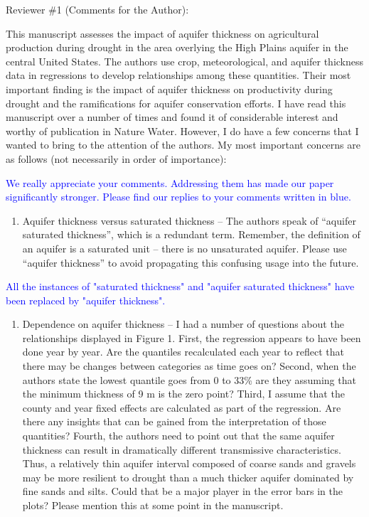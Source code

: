 \documentclass[
]{article}
\author{}
\date{\vspace{-2.5em}}
\providecommand{\tightlist}{%
  \setlength{\itemsep}{0pt}\setlength{\parskip}{0pt}}
\begin{document}
Reviewer \#1 (Comments for the Author):

This manuscript assesses the impact of aquifer thickness on agricultural
production during drought in the area overlying the High Plains aquifer
in the central United States. The authors use crop, meteorological, and
aquifer thickness data in regressions to develop relationships among
these quantities. Their most important finding is the impact of aquifer
thickness on productivity during drought and the ramifications for
aquifer conservation efforts. I have read this manuscript over a number
of times and found it of considerable interest and worthy of publication
in Nature Water. However, I do have a few concerns that I wanted to
bring to the attention of the authors. My most important concerns are as
follows (not necessarily in order of importance):

\textcolor{blue}{We really appreciate your comments. Addressing them has made our paper significantly stronger. Please find our replies to your comments written in blue.}

\begin{enumerate}
\def\labelenumi{\arabic{enumi}.}
\tightlist
\item
  Aquifer thickness versus saturated thickness -- The authors speak of
  ``aquifer saturated thickness'', which is a redundant term. Remember,
  the definition of an aquifer is a saturated unit -- there is no
  unsaturated aquifer. Please use ``aquifer thickness'' to avoid
  propagating this confusing usage into the future.
\end{enumerate}

\textcolor{blue}{All the instances of "saturated thickness" and "aquifer saturated thickness" have been replaced by "aquifer thickness".}

\begin{enumerate}
\def\labelenumi{\arabic{enumi}.}
\setcounter{enumi}{1}
\tightlist
\item
  Dependence on aquifer thickness -- I had a number of questions about
  the relationships displayed in Figure 1. First, the regression appears
  to have been done year by year. Are the quantiles recalculated each
  year to reflect that there may be changes between categories as time
  goes on? Second, when the authors state the lowest quantile goes from
  0 to 33\% are they assuming that the minimum thickness of 9 m is the
  zero point? Third, I assume that the county and year fixed effects are
  calculated as part of the regression. Are there any insights that can
  be gained from the interpretation of those quantities? Fourth, the
  authors need to point out that the same aquifer thickness can result
  in dramatically different transmissive characteristics. Thus, a
  relatively thin aquifer interval composed of coarse sands and gravels
  may be more resilient to drought than a much thicker aquifer dominated
  by fine sands and silts. Could that be a major player in the error
  bars in the plots? Please mention this at some point in the
  manuscript.
\end{enumerate}
\end{document}
